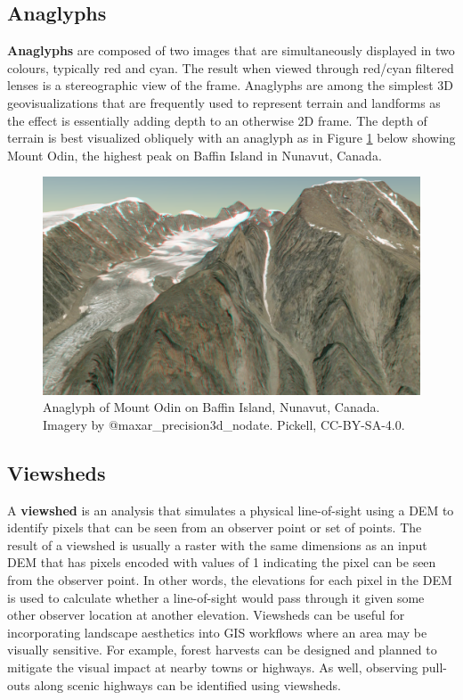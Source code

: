 \documentclass[
]{book}
\begin{document}
\subsection{Anaglyphs}\label{anaglyphs}

\textbf{Anaglyphs} are composed of two images that are simultaneously displayed in two colours, typically red and cyan. The result when viewed through red/cyan filtered lenses is a stereographic view of the frame. Anaglyphs are among the simplest 3D geovisualizations that are frequently used to represent terrain and landforms as the effect is essentially adding depth to an otherwise 2D frame. The depth of terrain is best visualized obliquely with an anaglyph as in Figure \ref{fig:9-baffin-island-mount-odin-1} below showing Mount Odin, the highest peak on Baffin Island in Nunavut, Canada.

\begin{figure}
\includegraphics[width=0.75\linewidth]{images/09-baffin-island-mount-odin-1} \caption{Anaglyph of Mount Odin on Baffin Island, Nunavut, Canada. Imagery by @maxar_precision3d_nodate. Pickell, CC-BY-SA-4.0.}\label{fig:9-baffin-island-mount-odin-1}
\end{figure}

\subsection{Viewsheds}\label{viewsheds}

A \textbf{viewshed} is an analysis that simulates a physical line-of-sight using a DEM to identify pixels that can be seen from an observer point or set of points. The result of a viewshed is usually a raster with the same dimensions as an input DEM that has pixels encoded with values of 1 indicating the pixel can be seen from the observer point. In other words, the elevations for each pixel in the DEM is used to calculate whether a line-of-sight would pass through it given some other observer location at another elevation. Viewsheds can be useful for incorporating landscape aesthetics into GIS workflows where an area may be visually sensitive. For example, forest harvests can be designed and planned to mitigate the visual impact at nearby towns or highways. As well, observing pull-outs along scenic highways can be identified using viewsheds.
\end{document}
